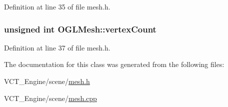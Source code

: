 Definition at line 35 of file mesh.\+h.

\hypertarget{class_o_g_l_mesh_a881b075268f51d438d4242d2380981ab}{}
\subsubsection[{vertex\+Count}]{\setlength{\rightskip}{0pt plus 5cm}unsigned int O\+G\+L\+Mesh\+::vertex\+Count\hspace{0.3cm}{\ttfamily [protected]}}\label{class_o_g_l_mesh_a881b075268f51d438d4242d2380981ab}


Definition at line 37 of file mesh.\+h.



The documentation for this class was generated from the following files\+:\begin{DoxyCompactItemize}
\item 
V\+C\+T\+\_\+\+Engine/scene/\hyperlink{mesh_8h}{mesh.\+h}\item 
V\+C\+T\+\_\+\+Engine/scene/\hyperlink{mesh_8cpp}{mesh.\+cpp}\end{DoxyCompactItemize}
